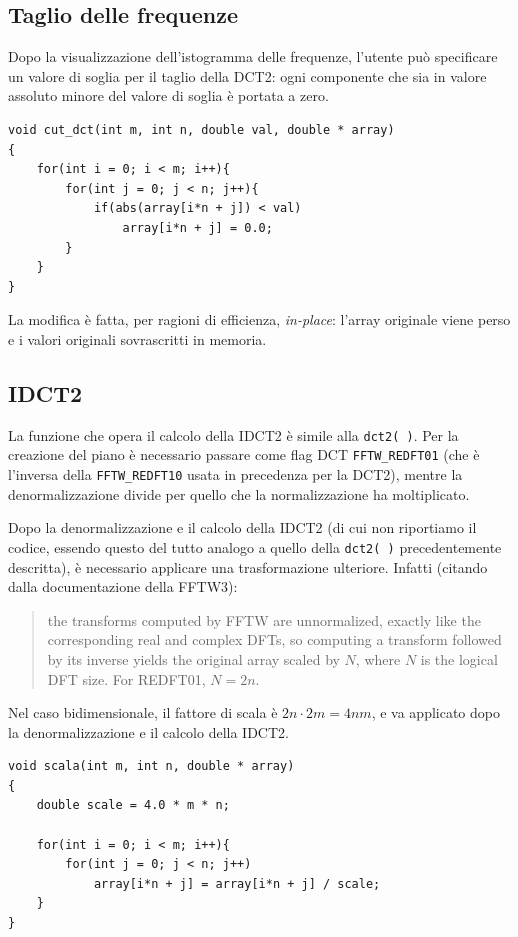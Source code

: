 \documentclass[11pt,a4paper]{scrartcl}
\begin{document}
\subsection*{Taglio delle frequenze}

Dopo la visualizzazione dell'istogramma delle frequenze, l'utente può specificare un valore di soglia per il taglio della DCT2: ogni componente che sia in valore assoluto minore del valore di soglia è portata a zero.


\begin{verbatim}
void cut_dct(int m, int n, double val, double * array)
{
    for(int i = 0; i < m; i++){
        for(int j = 0; j < n; j++){
            if(abs(array[i*n + j]) < val)
                array[i*n + j] = 0.0;
        }
    }
}
\end{verbatim}

La modifica è fatta, per ragioni di efficienza, \emph{in-place}: l'array originale viene perso e i valori originali sovrascritti in memoria.

\subsection*{IDCT2}

La funzione che opera il calcolo della IDCT2 è simile alla \texttt{dct2( )}. Per la creazione del piano è necessario passare come flag DCT \texttt{FFTW\_REDFT01} (che è l'inversa della \texttt{FFTW\_REDFT10} usata in precedenza per la DCT2), mentre la denormalizzazione divide per quello che la normalizzazione ha moltiplicato.

Dopo la denormalizzazione e il calcolo della IDCT2 (di cui non riportiamo il codice, essendo questo del tutto analogo a quello della \texttt{dct2( )} precedentemente descritta), è necessario applicare una trasformazione ulteriore. Infatti (citando dalla documentazione della FFTW3):
\begin{quotation}
the transforms computed by FFTW are unnormalized, exactly like the corresponding real and complex DFTs, so computing a transform followed by its inverse yields the original array scaled by $N$, where $N$ is the logical DFT size. For REDFT01, $N=2n$. 
\end{quotation}

Nel caso bidimensionale, il fattore di scala è $2n \cdot 2m = 4nm$, e va applicato dopo la denormalizzazione e  il calcolo della IDCT2.

\begin{verbatim}
void scala(int m, int n, double * array)
{
    double scale = 4.0 * m * n;

    for(int i = 0; i < m; i++){
        for(int j = 0; j < n; j++)
            array[i*n + j] = array[i*n + j] / scale;
    }
}
\end{verbatim}
\end{document}

